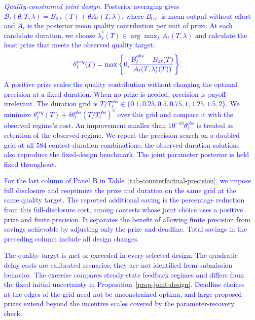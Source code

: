\textcolor{blue}{\textit{Quality-constrained joint design.} Posterior averaging gives $\overline{\mathcal B}_\ell(\theta,T,\lambda)=B_{0\ell}(T)+\theta A_\ell(T,\lambda)$, where $B_{0\ell}$ is mean output without effort and $A_\ell$ is the posterior mean quality contribution per unit of prize. At each candidate duration, we choose $\lambda_\ell^*(T)\in\arg\max_\lambda A_\ell(T,\lambda)$ and calculate the least prize that meets the observed quality target:}
\[
\textcolor{blue}{\theta_\ell^{req}(T)=\max\left\{0,\frac{\overline{\mathcal B}_\ell^{obs}-B_{0\ell}(T)}{A_\ell(T,\lambda_\ell^*(T))}\right\}.}
\]
\textcolor{blue}{A positive prize scales the quality contribution without changing the optimal precision at a fixed duration. When no prize is needed, precision is payoff-irrelevant. The duration grid is $T/T_\ell^{obs}\in\{0.1,0.25,0.5,0.75,1,1.25,1.5,2\}$. We minimize $\theta_\ell^{req}(T)+\delta\theta_\ell^{obs}(T/T_\ell^{obs})^2$ over this grid and compare it with the observed regime's cost. An improvement smaller than $10^{-10}\theta_\ell^{obs}$ is treated as retention of the observed regime. We repeat the precision search on a doubled grid at all 584 contest-duration combinations; the observed-duration solutions also reproduce the fixed-design benchmark. The joint parameter posterior is held fixed throughout.}

\textcolor{blue}{For the last column of Panel B in Table~\ref{tab-counterfactual-precision}, we impose full disclosure and reoptimize the prize and duration on the same grid at the same quality target. The reported additional saving is the percentage reduction from this full-disclosure cost, among contests whose joint choice uses a positive prize and finite precision. It separates the benefit of allowing finite precision from savings achievable by adjusting only the prize and deadline. Total savings in the preceding column include all design changes.}

\textcolor{blue}{The quality target is met or exceeded in every selected design. The quadratic delay costs are calibrated scenarios; they are not identified from submission behavior. The exercise compares steady-state feedback regimes and differs from the fixed initial uncertainty in Proposition~\ref{prop-joint-design}. Deadline choices at the edges of the grid need not be unconstrained optima, and large proposed prizes extend beyond the incentive scales covered by the parameter-recovery check.}

